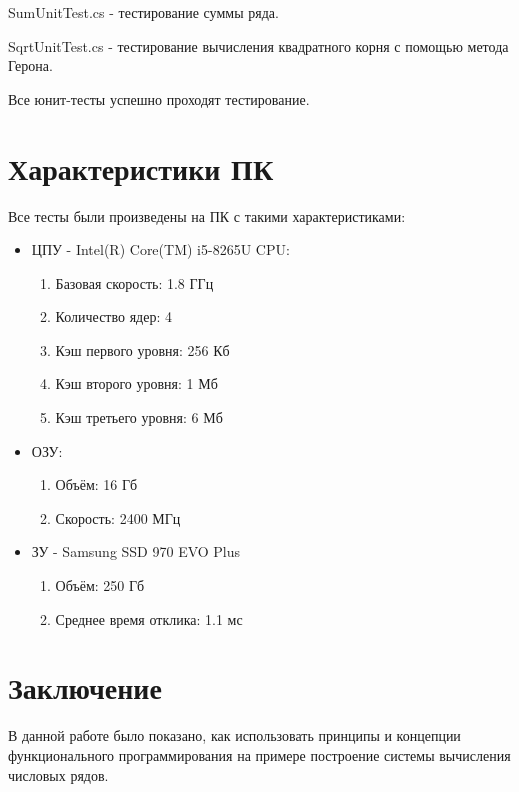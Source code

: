 \begin{code}
	
	\caption{SumUnitTest.cs - тестирование суммы ряда.}
\end{code}

\begin{code}
	
	\caption{SqrtUnitTest.cs - тестирование вычисления квадратного корня с помощью метода Герона.}
\end{code}

Все юнит-тесты успешно проходят тестирование.

\newpage
\section{Характеристики ПК}

Все тесты были произведены на ПК с такими характеристиками:

\begin{itemize}
	\item ЦПУ - Intel(R) Core(TM) i5-8265U CPU:
	\begin{enumerate}
		\item Базовая скорость: 1.8 ГГц
		\item Количество ядер: 4
		\item Кэш первого уровня: 256 Кб
		\item Кэш второго уровня: 1 Мб
		\item Кэш третьего уровня: 6 Мб
	\end{enumerate}
	\item ОЗУ:
	\begin{enumerate}
		\item Объём: 16 Гб
		\item Скорость: 2400 МГц
	\end{enumerate}
	\item ЗУ - Samsung SSD 970 EVO Plus
	\begin{enumerate}
		\item Объём: 250 Гб
		\item Среднее время отклика: 1.1 мс
	\end{enumerate}
\end{itemize}

\newpage
\section*{Заключение}
В данной работе было показано, как использовать принципы и концепции функционального программирования на примере построение системы вычисления числовых рядов.
